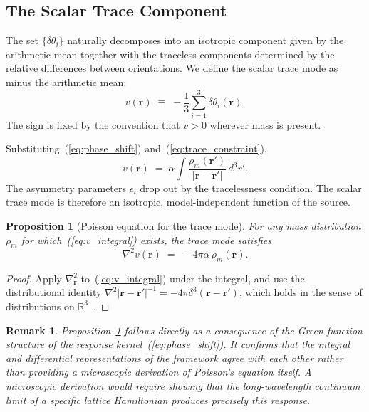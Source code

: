 \documentclass[a4paper,fleqn]{cas-dc}
\theoremstyle{thmstyleone}%
\newtheorem{proposition}[theorem]{Proposition}
\theoremstyle{thmstyletwo}%
\newtheorem{remark}{Remark}%
\begin{document}
\subsection{The Scalar Trace Component}

The set $\{\delta\theta_i\}$ naturally decomposes into an
isotropic component given by the arithmetic mean together
with the traceless components determined by the relative
differences between orientations. We define the scalar trace
mode as minus the arithmetic mean:
\begin{equation}
    v(\mathbf{r})
    \;\equiv\;
    -\frac{1}{3}\sum_{i=1}^{3}\delta\theta_i(\mathbf{r}).
    \label{eq:void_def}
\end{equation}
The sign is fixed by the convention that $v>0$ wherever mass
is present.

Substituting~(\ref{eq:phase_shift}) and~(\ref{eq:trace_constraint}),
\begin{equation}
    v(\mathbf{r})
    \;=\;
    \alpha\int
    \frac{\rho_m(\mathbf{r}')}{|\mathbf{r}-\mathbf{r}'|}
    \,d^3r'.
    \label{eq:v_integral}
\end{equation}
The asymmetry parameters $\epsilon_i$ drop out by the
tracelessness condition. The scalar trace mode is therefore
an isotropic, model-independent function of the source.

\begin{proposition}[Poisson equation for the trace mode]
\label{prop:poisson}
For any mass distribution $\rho_m$ for which~(\ref{eq:v_integral})
exists, the trace mode satisfies
\begin{equation}
    \nabla^2 v(\mathbf{r})
    \;=\;
    -4\pi\alpha\,\rho_m(\mathbf{r}).
    \label{eq:poisson}
\end{equation}
\end{proposition}

\begin{proof}
Apply $\nabla^2_{\mathbf{r}}$ to~(\ref{eq:v_integral}) under
the integral, and use the distributional identity
$\nabla^2|\mathbf{r}-\mathbf{r}'|^{-1}=-4\pi\delta^3
(\mathbf{r}-\mathbf{r}')$, which holds in the sense of
distributions on $\mathbb{R}^3$~\cite{Jackson1999,Evans2010}.
\end{proof}

\begin{remark}
\label{rem:poisson_is_kernel}
Proposition~\ref{prop:poisson} follows directly as a
consequence of the Green-function structure of the response
kernel~(\ref{eq:phase_shift}). It confirms that the integral
and differential representations of the framework agree with
each other rather than providing a microscopic derivation of
Poisson's equation itself. A microscopic derivation would
require showing that the long-wavelength continuum limit of a
specific lattice Hamiltonian produces precisely this response.
\end{remark}
\end{document}
